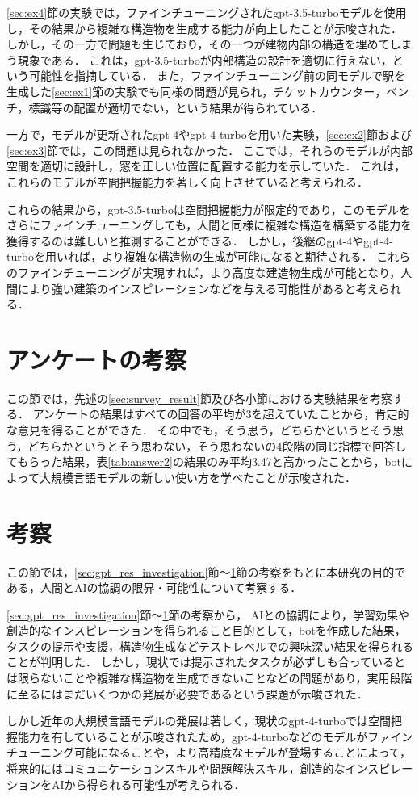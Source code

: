 \ref{sec:ex4}節の実験では，ファインチューニングされたgpt-3.5-turboモデルを使用し，その結果から複雑な構造物を生成する能力が向上したことが示唆された．
しかし，その一方で問題も生じており，その一つが建物内部の構造を埋めてしまう現象である．
これは，gpt-3.5-turboが内部構造の設計を適切に行えない，という可能性を指摘している．
また，ファインチューニング前の同モデルで駅を生成した\ref{sec:ex1}節の実験でも同様の問題が見られ，チケットカウンター，ベンチ，標識等の配置が適切でない，という結果が得られている．

一方で，モデルが更新されたgpt-4やgpt-4-turboを用いた実験，\ref{sec:ex2}節および\ref{sec:ex3}節では，この問題は見られなかった．
ここでは，それらのモデルが内部空間を適切に設計し，窓を正しい位置に配置する能力を示していた．
これは，これらのモデルが空間把握能力を著しく向上させていると考えられる．

これらの結果から，gpt-3.5-turboは空間把握能力が限定的であり，このモデルをさらにファインチューニングしても，人間と同様に複雑な構造を構築する能力を獲得するのは難しいと推測することができる．
しかし，後継のgpt-4やgpt-4-turboを用いれば，より複雑な構造物の生成が可能になると期待される．
これらのファインチューニングが実現すれば，より高度な建造物生成が可能となり，人間により強い建築のインスピレーションなどを与える可能性があると考えられる．

\section{アンケートの考察}\label{sec:survey_investigation}
この節では，先述の\ref{sec:survey_result}節及び各小節における実験結果を考察する．
アンケートの結果はすべての回答の平均が3を超えていたことから，肯定的な意見を得ることができた．
その中でも，そう思う，どちらかというとそう思う，どちらかというとそう思わない，そう思わないの4段階の同じ指標で回答してもらった結果，表\ref{tab:answer2}の結果のみ平均3.47と高かったことから，botによって大規模言語モデルの新しい使い方を学べたことが示唆された．

\section{考察}
この節では，\ref{sec:gpt_res_investigation}節～\ref{sec:survey_investigation}節の考察をもとに本研究の目的である，人間とAIの協調の限界・可能性について考察する．

\ref{sec:gpt_res_investigation}節～\ref{sec:survey_investigation}節の考察から，
AIとの協調により，学習効果や創造的なインスピレーションを得られること目的として，botを作成した結果，タスクの提示や支援，構造物生成などテストレベルでの興味深い結果を得られることが判明した．
しかし，現状では提示されたタスクが必ずしも合っているとは限らないことや複雑な構造物を生成できないことなどの問題があり，実用段階に至るにはまだいくつかの発展が必要であるという課題が示唆された．

しかし近年の大規模言語モデルの発展は著しく，現状のgpt-4-turboでは空間把握能力を有していることが示唆されたため，gpt-4-turboなどのモデルがファインチューニング可能になることや，より高精度なモデルが登場することによって，
将来的にはコミュニケーションスキルや問題解決スキル，創造的なインスピレーションをAIから得られる可能性が考えられる．
